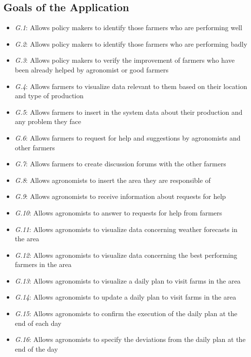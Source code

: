 \subsection{Goals of the Application}
\begin{itemize}
    \item \textit {G.1}: Allows policy makers to identify those farmers who are performing well
    \item \textit {G.2}: Allows policy makers to identify those farmers who are performing badly
    \item \textit {G.3}: Allows policy makers to verify the improvement of farmers who have been already helped by agronomist or good farmers
    \item \textit {G.4}: Allows farmers to visualize data relevant to them based on their location and type of production
    \item \textit {G.5}: {\color{red}  Allows farmers to insert in the system data about their production and any problem they face}
    \item \textit {G.6}: Allows farmers to request for help and suggestions by agronomists and other farmers
    \item \textit {G.7}: Allows farmers to create discussion forums with the other farmers
    \item \textit {G.8}: {\color{red}  Allows agronomists to insert the area they are responsible of}
    \item \textit {G.9}: {\color{red}  Allows agronomists to receive information about requests for help}
    \item \textit {G.10}: Allows agronomists to answer to requests for help from farmers
    \item \textit {G.11}: Allows agronomists to visualize data concerning weather forecasts in the area
    \item \textit {G.12}: Allows agronomists to visualize data concerning the best performing farmers in the area
    \item \textit {G.13}: Allows agronomists to visualize a daily plan to visit farms in the area
    \item \textit {G.14}: Allows agronomists to update a daily plan to visit farms in the area
    \item \textit {G.15}: Allows agronomists to confirm the execution of the daily plan at the end of each day 
    \item \textit {G.16}: Allows agronomists to specify the deviations from the daily plan at the end of the day

\end{itemize}